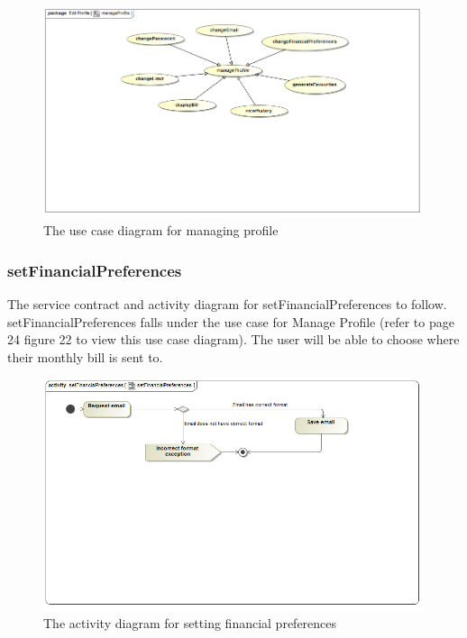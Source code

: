 \documentclass[a4paper,12pt]{article}
\begin{document}
\begin{figure}[H]
  \centering
    \includegraphics[width=1.0\textwidth]{../Diagrams/ManageProfile/manageProfileUseCase.png}
    \caption{The use case diagram for managing profile} 
\end{figure}

\subsubsection{setFinancialPreferences}
The service contract and activity diagram for setFinancialPreferences to follow. setFinancialPreferences falls under the use case for Manage Profile (refer to page 24 figure 22 to view this use case diagram). The user will be able to choose where their monthly bill  is sent to.
\begin{figure}[H]
  \centering
    \includegraphics[width=1.0\textwidth]{../Diagrams/ManageProfile/ActivityDiagrams/setFinancialPreferences1.png}
    \caption{The activity diagram for setting financial preferences} 
\end{figure}
\end{document}
